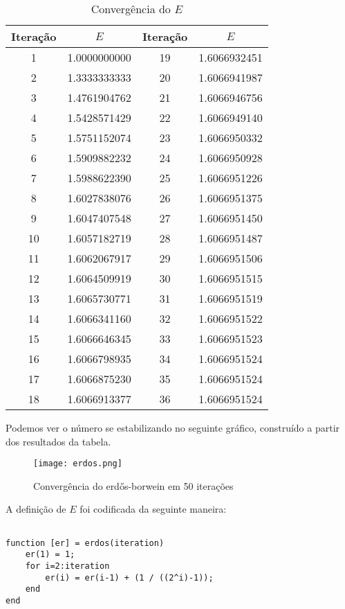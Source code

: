 \begin{table}[H]
	\centering
	\begin{tabular}{|c|c|c|c|}
    	\hline
		Iteração & $E$ & Iteração & $E$ \\
    	\hline
		1 & 1.0000000000 & 19 & 1.6066932451 \\
    	\hline
		2 & 1.3333333333 & 20 & 1.6066941987 \\
    	\hline
		3 & 1.4761904762 & 21 & 1.6066946756 \\
    	\hline
		4 & 1.5428571429 & 22 & 1.6066949140 \\
    	\hline
		5 & 1.5751152074 & 23 & 1.6066950332 \\
    	\hline
		6 & 1.5909882232 & 24 & 1.6066950928 \\
    	\hline
		7 & 1.5988622390 & 25 & 1.6066951226 \\
    	\hline
		8 & 1.6027838076 & 26 & 1.6066951375 \\
    	\hline
		9 & 1.6047407548 & 27 & 1.6066951450 \\
    	\hline
		10 & 1.6057182719 & 28 & 1.6066951487 \\
    	\hline
		11 & 1.6062067917 & 29 & 1.6066951506 \\
    	\hline
		12 & 1.6064509919 & 30 & 1.6066951515 \\
    	\hline
		13 & 1.6065730771 & 31 & 1.6066951519 \\
    	\hline
		14 & 1.6066341160 & 32 & 1.6066951522 \\
    	\hline
		15 & 1.6066646345 & 33 & 1.6066951523 \\
    	\hline
		16 & 1.6066798935 & 34 & 1.6066951524 \\
    	\hline
		17 & 1.6066875230 & 35 & 1.6066951524 \\
    	\hline
		18 & 1.6066913377 & 36 & 1.6066951524 \\
    	\hline
	\end{tabular}
	\label{erdos_table}
	\caption{Convergência do $E$}
\end{table}

Podemos ver o número se estabilizando no seguinte gráfico, construído a partir
dos resultados da tabela.

\begin{figure}[H]
    \centering
    \texttt{[image: erdos.png]}
    \caption{Convergência do erdős-borwein em 50 iterações}
	\label{erdos_graphic}
\end{figure}

A definição de $E$ foi codificada da seguinte maneira:

\begin{lstlisting}

function [er] = erdos(iteration)
	er(1) = 1;
	for i=2:iteration
		er(i) = er(i-1) + (1 / ((2^i)-1));
	end
end

\end{lstlisting}
